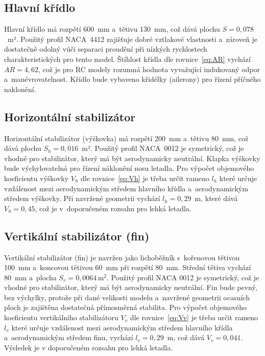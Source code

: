 \documentclass[12pt, a4paper, oneside]{report}
\begin{document}
\subsection{Hlavní křídlo}

Hlavní křídlo má rozpětí 600~mm a~tětivu 130~mm, což dává plochu $S = 0{,}078$~m².
Použitý profil NACA~4412 zajišťuje dobré vztlakové vlastnosti a~zároveň je dostatečně
odolný vůči separaci proudění při nízkých rychlostech charakteristických pro tento model.
Štíhlost křídla dle rovnice~\ref{eq:AR} vychází $AR = 4{,}62$,
což je pro RC modely rozumná hodnota vyvažující indukovaný odpor a~manévrovatelnost.
Křídlo bude vybaveno křidélky (ailerony) pro řízení příčného naklonění.


\subsection{Horizontální stabilizátor}

Horizontální stabilizátor (výškovka) má rozpětí 200~mm a~tětivu 80~mm, což dává plochu $S_h = 0{,}016$~m².
Použitý profil NACA~0012 je symetrický, což je vhodné pro stabilizátor, který má být aerodynamicky neutrální.
Klapka výškovky bude výchylovatelná pro řízení náklonění nosu letadla. Pro výpočet objemového 
koeficientu výškovky $V_h$ dle rovnice~\ref{eq:Vh} je třeba určit rameno $l_h$ které určuje vzdálenost mezi
 aerodynamickým středem hlavního křídla a~aerodynamickým středem výškovky. Při navržené geometrii vychází $l_h = 0{,}29$~m, které dává $V_h = 0{,}45$, což je v~doporučeném rozsahu pro lehká letadla.


\subsection{Vertikální stabilizátor (fin)}

Vertikální stabilizátor (fin) je navržen jako lichoběžník s~kořenovou tětivou 100~mm a~koncovou tětivou 60~mm při rozpětí 80~mm. Střední
tětiva vychází 80~mm a~plocha $S_v = 0{,}0064\,\text{m}^2$. Použitý 
profil NACA 0012 je symetrický, což je vhodné pro stabilizátor, který má být aerodynamicky neutrální.
Fin bude pevný, bez výchylky, protože při dané velikosti modelu a~navržené geometrii ocasních ploch je zajištěna dostatečná přímosměrná stabilita. 
Pro výpočet objemového koeficientu vertikálního stabilizátoru $V_v$ dle rovnice~\ref{eq:Vv} 
je třeba určit rameno $l_v$ které určuje vzdálenost mezi aerodynamickým středem hlavního křídla a~aerodynamickým středem finu, vychází $l_v = 0{,}29$~m, což dává $V_v = 0{,}041$. Výsledek je v doporučeném rozsahu pro lehká letadla.
\end{document}
